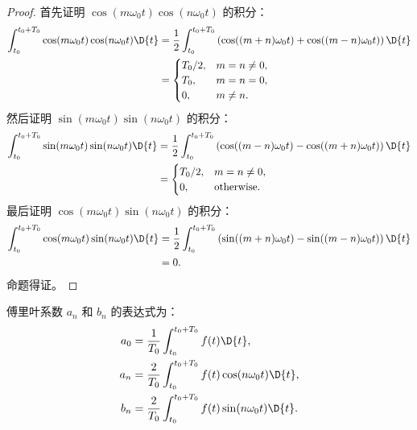 \begin{proof}
    首先证明 $\cos(m\omega_0 t)\cos(n\omega_0 t)$ 的积分：
    \begin{align*}
        \int_{t_0}^{t_0 + T_0}\cos(m\omega_0 t)\cos(n\omega_0 t)\D{t}
        & = \frac{1}{2}\int_{t_0}^{t_0 + T_0}\left(\cos((m + n)\omega_0 t) + \cos((m - n)\omega_0 t)\right)\D{t} \\
        & = \begin{cases}
            T_0 / 2, & m = n \neq 0, \\
            T_0, & m = n = 0, \\
            0, & m \neq n.
        \end{cases}
    \end{align*}
    然后证明 $\sin(m\omega_0 t)\sin(n\omega_0 t)$ 的积分：
    \begin{align*}
        \int_{t_0}^{t_0 + T_0}\sin(m\omega_0 t)\sin(n\omega_0 t)\D{t}
        & = \frac{1}{2}\int_{t_0}^{t_0 + T_0}\left(\cos((m - n)\omega_0 t) - \cos((m + n)\omega_0 t)\right)\D{t} \\
        & = \begin{cases}
            T_0 / 2, & m = n \neq 0, \\
            0, & \text{otherwise}.
        \end{cases}
    \end{align*}
    最后证明 $\cos(m\omega_0 t)\sin(n\omega_0 t)$ 的积分：
    \begin{align*}
        \int_{t_0}^{t_0 + T_0}\cos(m\omega_0 t)\sin(n\omega_0 t)\D{t}
        & = \frac{1}{2}\int_{t_0}^{t_0 + T_0}\left(\sin((m + n)\omega_0 t) - \sin((m - n)\omega_0 t)\right)\D{t} \\
        & = 0.
    \end{align*}
    命题得证。
\end{proof}

\begin{corollary}
    傅里叶系数 $a_n$ 和 $b_n$ 的表达式为：
    \begin{align*}
        a_0 & = \frac{1}{T_0}\int_{t_0}^{t_0 + T_0}f(t)\D{t}, \\
        a_n & = \frac{2}{T_0}\int_{t_0}^{t_0 + T_0}f(t)\cos(n\omega_0 t)\D{t}, \\
        b_n & = \frac{2}{T_0}\int_{t_0}^{t_0 + T_0}f(t)\sin(n\omega_0 t)\D{t}.
    \end{align*}
\end{corollary}

